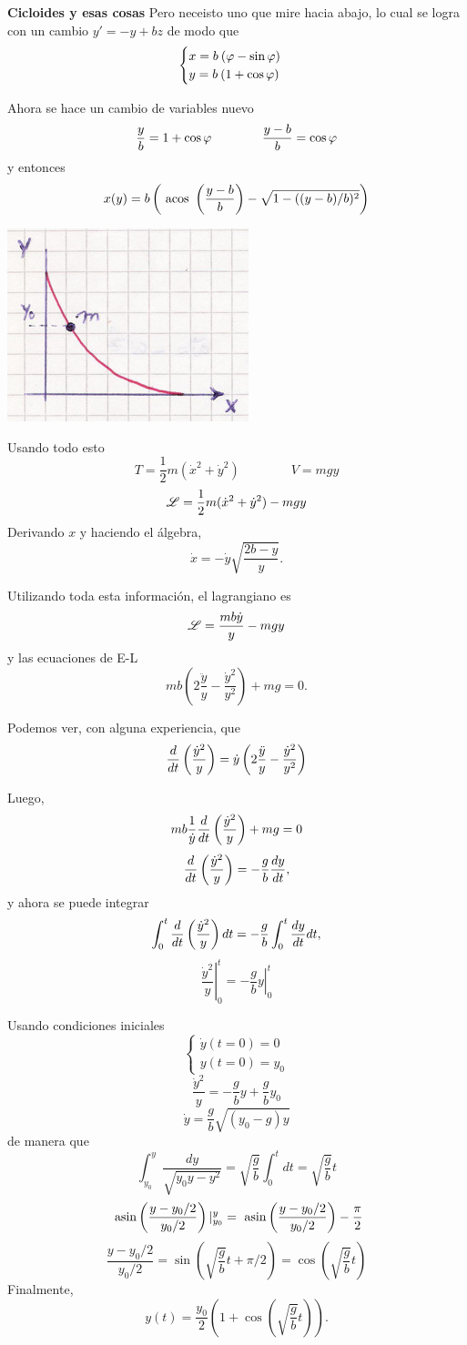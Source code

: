 \documentclass[10pt,oneside]{CBFT_book}
\begin{document}
\begin{ejemplo}{\bf Cicloides y esas cosas}
Pero neceisto uno que mire hacia abajo, lo cual se logra con un cambio $y' = -y + bz $ de modo que 
\[
	\begin{cases}  x = b \: (\varphi - \sin \varphi )\\
		       y = b \: (1 + \cos \varphi )
	\end{cases}
\]

Ahora se hace un cambio de variables nuevo 
\[
	\frac y b = 1 + \cos\varphi \qquad \qquad \frac{y-b}{b} = \cos \varphi
\]
y entonces
\[
	x(y) = b \left( \text{ acos }\left( \frac{y-b}{b} \right) - \sqrt{1 - ( (y-b)/b )^2} \right)
\]

\includegraphics[scale=0.2]{images/fig_mc_cicloide_tobogan.jpg}

Usando todo esto
\[
	T = \frac 1 2 m ( \dot{x}^2 + \dot{y}^2 ) \qquad \qquad V = m g y
\]
\[
	\mathscr{L} = \frac 1 2 m ( \dot{x}^2 + \dot{y}^2) - mgy
\]
Derivando $x$ y haciendo el álgebra,
\[
	\dot{x} = -\dot{y} \sqrt{ \frac{ 2b - y }{y} }.
\]

Utilizando toda esta información, el lagrangiano es
\[
	\mathscr{L} = \frac{mb\dot{y}}{y} - mgy
\]
y las ecuaciones de E-L
\[
	mb\left( 2\frac{\ddot{y}}{y} - \frac{\dot{y}^2}{y^2} \right) + mg = 0.
\]

Podemos ver, con alguna experiencia, que 
\[
	\frac{d^{\hspace{-0.05em}} {}}{d {t}^{\hspace{-0.05em}}}\left( \frac{ \dot{y}^2 }{y} \right) = \dot{y} \left( 2 \frac{ \ddot{y} }{y} - \frac{\dot{y}^2}{y^2} \right)
\]

Luego,
\[
	m b \frac{1}{\dot{y}} \frac{d^{\hspace{-0.05em}} {}}{d {t}^{\hspace{-0.05em}}}\left( \frac{ \dot{y}^2 }{y} \right) + m g = 0
\]
\[
	\frac{d^{\hspace{-0.05em}} {}}{d {t}^{\hspace{-0.05em}}}\left( \frac{ \dot{y}^2 }{y} \right) = - \frac{ g }{ b } \frac{d^{\hspace{-0.05em}} {y}}{d {t}^{\hspace{-0.05em}}},
\]
y ahora se puede integrar
\[
	\int_0^t \frac{d^{\hspace{-0.05em}} {}}{d {t}^{\hspace{-0.05em}}}\left( \frac{ \dot{y}^2 }{y} \right) dt = 
	- \frac{ g }{ b } \int_0^t \frac{d^{\hspace{-0.05em}} {y}}{d {t}^{\hspace{-0.05em}}} dt,
\]
\[
	\left. \frac{ \dot{y}^2 }{y} \right|_0^t = - \left. \frac{ g }{ b } y \right|_0^t
\]

Usando condiciones iniciales
\[
	\begin{cases}
	 \dot{y}(t=0) = 0 \\
	 y(t=0) = y_0
	\end{cases}
\]
\[
	\frac{ \dot{y}^2 }{ y } = -\frac{ g }{ b } y +  \frac{ g }{ b } y_0
\]
\[
	\dot{y} = \frac{g}{b} \sqrt{ (y_0 - g) y }
\]
de manera que 
\[
	\int_{y_0}^{y} \frac{ dy }{ \sqrt{ y_0y - y^2 } } = \sqrt{ \frac g b } \int_0^t dt = \sqrt{ \frac g b } t
\]
\[
	\text{ asin}\left( \frac{ y - y_0/2 }{y_0/2} \right)|_{y_0}^y = \text{ asin}\left( \frac{y - y_0/2}{y_0/2} \right)  - \frac \pi 2
\]
\[
	\frac{y - y_0/2}{y_0/2} = \sin ( \sqrt{ \frac g b } t + \pi/2 ) = \cos ( \sqrt{ \frac g b } t )
\]
Finalmente,
\[
	y(t) = \frac {y_0} 2 ( 1 + \cos ( \sqrt{ \frac g b } t ) ).
\]


\end{ejemplo}
\end{document}
